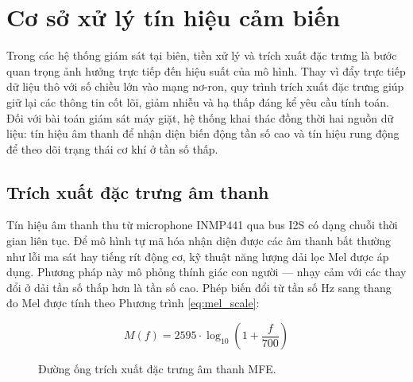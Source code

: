 ﻿

\section{Cơ sở xử lý tín hiệu cảm biến}

Trong các hệ thống giám sát tại biên, tiền xử lý và trích xuất đặc trưng là bước quan trọng ảnh hưởng trực tiếp đến hiệu suất của mô hình. Thay vì đẩy trực tiếp dữ liệu thô với số chiều lớn vào mạng nơ-ron, quy trình trích xuất đặc trưng giúp giữ lại các thông tin cốt lõi, giảm nhiễu và hạ thấp đáng kể yêu cầu tính toán. Đối với bài toán giám sát máy giặt, hệ thống khai thác đồng thời hai nguồn dữ liệu: tín hiệu âm thanh để nhận diện biến động tần số cao và tín hiệu rung động để theo dõi trạng thái cơ khí ở tần số thấp.

\subsection{Trích xuất đặc trưng âm thanh}
\label{subsec:audio_features}

Tín hiệu âm thanh thu từ microphone INMP441 qua bus I2S có dạng chuỗi thời gian liên tục. Để mô hình tự mã hóa nhận diện được các âm thanh bất thường như lỗi ma sát hay tiếng rít động cơ, kỹ thuật năng lượng dải lọc Mel được áp dụng. Phương pháp này mô phỏng thính giác con người — nhạy cảm với các thay đổi ở dải tần số thấp hơn là tần số cao. Phép biến đổi từ tần số Hz sang thang đo Mel được tính theo Phương trình \ref{eq:mel_scale}:

\begin{equation}
\label{eq:mel_scale}
M(f) = 2595 \cdot \log_{10} \left( 1 + \frac{f}{700} \right)
\end{equation}

\begin{figure}[H]
\centering
{}
\caption{Đường ống trích xuất đặc trưng âm thanh MFE.}
\label{fig:audio_mfe_pipeline}
\end{figure}

